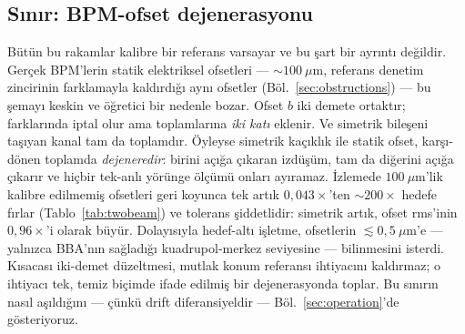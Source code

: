 \documentclass[aps,prab,reprint,superscriptaddress,nofootinbib]{revtex4-2}
\begin{document}
\subsection{Sınır: BPM-ofset dejenerasyonu}
\label{sec:limit}

Bütün bu rakamlar kalibre bir referans varsayar ve bu şart bir ayrıntı değildir.
Gerçek BPM'lerin statik elektriksel ofsetleri --- $\sim\!100~\mu$m, referans denetim
zincirinin farklamayla kaldırdığı aynı ofsetler (Böl.~\ref{sec:obstructions}) --- bu
şemayı keskin ve öğretici bir nedenle bozar. Ofset $b$ iki demete ortaktır; farklarında
iptal olur ama toplamlarına \emph{iki katı} eklenir. Ve simetrik bileşeni taşıyan
kanal tam da toplamdır. Öyleyse simetrik kaçıklık ile statik ofset, karşı-dönen
toplamda \emph{dejeneredir}: birini açığa çıkaran izdüşüm, tam da diğerini açığa
çıkarır ve hiçbir tek-anlı yörünge ölçümü onları ayıramaz. İzlemede $100~\mu$m'lik
kalibre edilmemiş ofsetleri geri koyunca tek artık $0{,}043\times$'ten
$\sim\!200\times$ hedefe fırlar (Tablo~\ref{tab:twobeam}) ve tolerans şiddetlidir:
simetrik artık, ofset rms'inin $0{,}96\times$'i olarak büyür. Dolayısıyla hedef-altı
işletme, ofsetlerin $\lesssim\!0{,}5~\mu$m'e --- yalnızca BBA'nın sağladığı
kuadrupol-merkez seviyesine --- bilinmesini isterdi. Kısacası iki-demet düzeltmesi,
mutlak konum referansı ihtiyacını kaldırmaz; o ihtiyacı tek, temiz biçimde ifade
edilmiş bir dejenerasyonda toplar. Bu sınırın nasıl aşıldığını --- çünkü drift
diferansiyeldir --- Böl.~\ref{sec:operation}'de gösteriyoruz.
\end{document}
